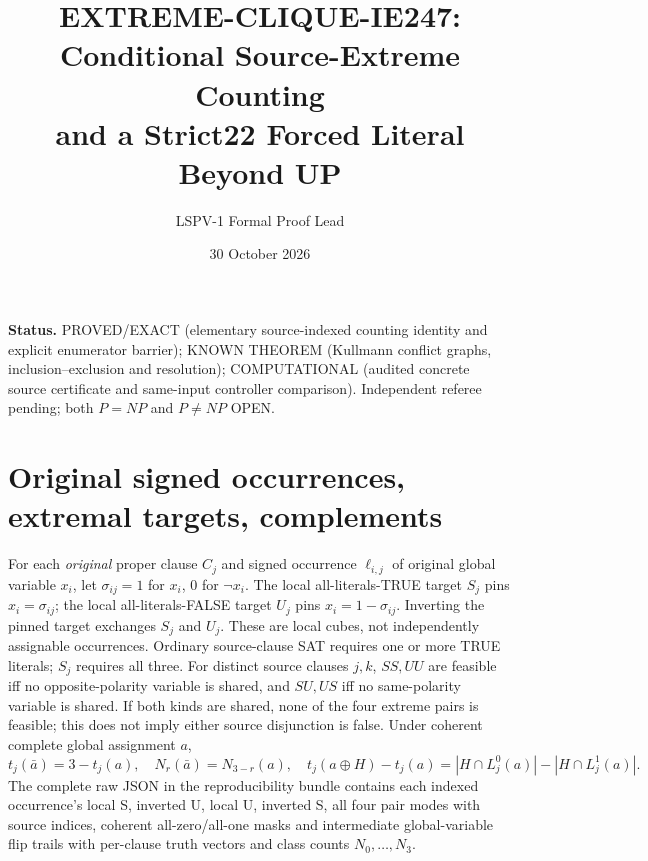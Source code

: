\documentclass[10pt]{article}
\title{EXTREME-CLIQUE-IE247: Conditional Source-Extreme Counting\\and a Strict22 Forced Literal Beyond UP}
\author{LSPV-1 Formal Proof Lead}
\date{30 October 2026}
\begin{document}
\maketitle
\noindent\textbf{Status.} PROVED/EXACT (elementary source-indexed counting identity and explicit enumerator barrier); KNOWN THEOREM (Kullmann conflict graphs, inclusion--exclusion and resolution); COMPUTATIONAL (audited concrete source certificate and same-input controller comparison). Independent referee pending; both $P=NP$ and $P\ne NP$ OPEN.

\section{Original signed occurrences, extremal targets, complements}
For each \emph{original} proper clause $C_j$ and signed occurrence $\ell_{i,j}$ of original global variable $x_i$, let $\sigma_{ij}=1$ for $x_i$, $0$ for $\neg x_i$. The local all-literals-TRUE target $S_j$ pins $x_i=\sigma_{ij}$; the local all-literals-FALSE target $U_j$ pins $x_i=1-\sigma_{ij}$. Inverting the pinned target exchanges $S_j$ and $U_j$. These are local cubes, not independently assignable occurrences. Ordinary source-clause SAT requires one or more TRUE literals; $S_j$ requires all three. For distinct source clauses $j,k$, $SS,UU$ are feasible iff no opposite-polarity variable is shared, and $SU,US$ iff no same-polarity variable is shared. If both kinds are shared, none of the four extreme pairs is feasible; this does not imply either source disjunction is false. Under coherent complete global assignment $a$,
\[
t_j(\bar a)=3-t_j(a),\quad N_r(\bar a)=N_{3-r}(a),\quad
t_j(a\oplus H)-t_j(a)=|H\cap L^0_j(a)|-|H\cap L^1_j(a)|.
\]
The complete raw JSON in the reproducibility bundle contains each indexed occurrence's local S, inverted U, local U, inverted S, all four pair modes with source indices, coherent all-zero/all-one masks and intermediate global-variable flip trails with per-clause truth vectors and class counts $N_0,\ldots,N_3$.
\end{document}
